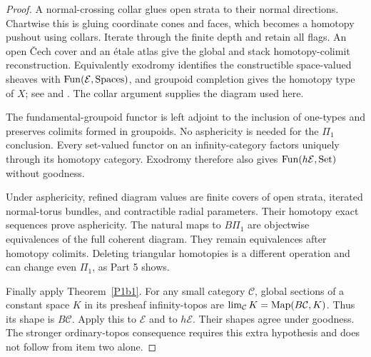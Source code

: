 \begin{proof}
A normal-crossing collar glues open strata to their normal
directions. Chartwise this is gluing coordinate cones
and faces, which becomes a homotopy pushout using collars.
Iterate through the finite depth and retain all flags.
An open Čech cover and an étale atlas give the global
and stack homotopy-colimit reconstruction.
Equivalently exodromy identifies the constructible
space-valued sheaves with $\operatorname{Fun}(\mathcal E,\mathrm{Spaces})$,
and groupoid completion gives the homotopy type of $X$;
see \citet[Appendix A.9]{LurieHA2017} and
\citet[Proposition 3.24 and Corollary 3.23]{JansenToolbox2024}.
The collar argument supplies the diagram used here.

The fundamental-groupoid functor is left adjoint to
the inclusion of one-types and preserves colimits
formed in groupoids. No asphericity is needed for
the $\Pi_1$ conclusion. Every set-valued functor
on an infinity-category factors uniquely through
its homotopy category. Exodromy therefore also gives
$\operatorname{Fun}(h\mathcal E,\mathrm{Set})$ without goodness.

Under asphericity, refined diagram values are
finite covers of open strata, iterated normal-torus
bundles, and contractible radial parameters.
Their homotopy exact sequences prove asphericity.
The natural maps to $B\Pi_1$ are objectwise
equivalences of the full coherent diagram.
They remain equivalences after homotopy colimits.
Deleting triangular homotopies is a different
operation and can change even $\Pi_1$, as Part 5 shows.

Finally apply Theorem~\ref{P1b1}. For any small category
$\mathcal C$, global sections of a constant space
$K$ in its presheaf infinity-topos are
$\lim_{\mathcal C}K=\operatorname{Map}(B\mathcal C,K)$.
Thus its shape is $B\mathcal C$.
Apply this to $\mathcal E$ and to $h\mathcal E$.
Their shapes agree under goodness. The stronger
ordinary-topos consequence requires this extra
hypothesis and does not follow from item two alone.
\end{proof}


